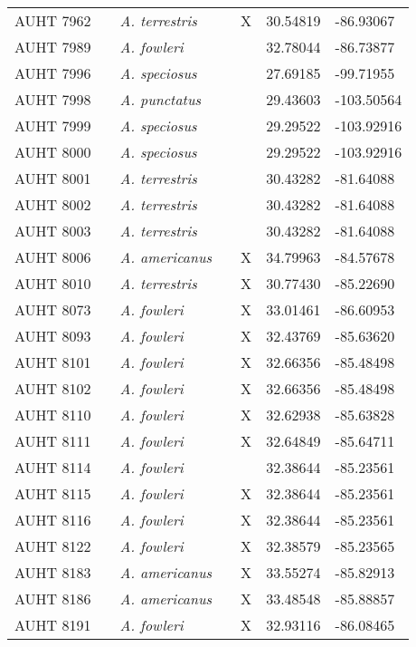 \begin{longtable}{ lllllll }
AUHT 7962 &  & \textit{A. terrestris} &  & X & 30.54819 & -86.93067 \\ 
AUHT 7989 &  & \textit{A. fowleri} &  &  & 32.78044 & -86.73877 \\ 
AUHT 7996 &  & \textit{A. speciosus} &  &  & 27.69185 & -99.71955 \\ 
AUHT 7998 &  & \textit{A. punctatus} &  &  & 29.43603 & -103.50564 \\ 
AUHT 7999 &  & \textit{A. speciosus} &  &  & 29.29522 & -103.92916 \\ 
AUHT 8000 &  & \textit{A. speciosus} &  &  & 29.29522 & -103.92916 \\ 
AUHT 8001 &  & \textit{A. terrestris} &  &  & 30.43282 & -81.64088 \\ 
AUHT 8002 &  & \textit{A. terrestris} &  &  & 30.43282 & -81.64088 \\ 
AUHT 8003 &  & \textit{A. terrestris} &  &  & 30.43282 & -81.64088 \\ 
AUHT 8006 &  & \textit{A. americanus} &  & X & 34.79963 & -84.57678 \\ 
AUHT 8010 &  & \textit{A. terrestris} &  & X & 30.77430 & -85.22690 \\ 
AUHT 8073 &  & \textit{A. fowleri} &  & X & 33.01461 & -86.60953 \\ 
AUHT 8093 &  & \textit{A. fowleri} &  & X & 32.43769 & -85.63620 \\ 
AUHT 8101 &  & \textit{A. fowleri} &  & X & 32.66356 & -85.48498 \\ 
AUHT 8102 &  & \textit{A. fowleri} &  & X & 32.66356 & -85.48498 \\ 
AUHT 8110 &  & \textit{A. fowleri} &  & X & 32.62938 & -85.63828 \\ 
AUHT 8111 &  & \textit{A. fowleri} &  & X & 32.64849 & -85.64711 \\ 
AUHT 8114 &  & \textit{A. fowleri} &  &  & 32.38644 & -85.23561 \\ 
AUHT 8115 &  & \textit{A. fowleri} &  & X & 32.38644 & -85.23561 \\ 
AUHT 8116 &  & \textit{A. fowleri} &  & X & 32.38644 & -85.23561 \\ 
AUHT 8122 &  & \textit{A. fowleri} &  & X & 32.38579 & -85.23565 \\ 
AUHT 8183 &  & \textit{A. americanus} &  & X & 33.55274 & -85.82913 \\ 
AUHT 8186 &  & \textit{A. americanus} &  & X & 33.48548 & -85.88857 \\ 
AUHT 8191 &  & \textit{A. fowleri} &  & X & 32.93116 & -86.08465 \\ 

\end{longtable}
